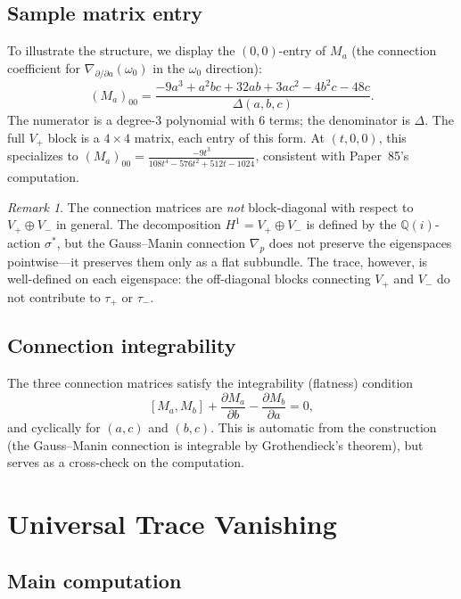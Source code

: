 \documentclass[11pt,a4paper]{article}
\theoremstyle{definition}
\theoremstyle{remark}
\newtheorem{remark}[theorem]{Remark}
\newcommand{\QQ}{\mathbb{Q}}
\begin{document}
\subsection{Sample matrix entry}

To illustrate the structure, we display the $(0,0)$-entry of $M_a$
(the connection coefficient for $\nabla_{\partial/\partial a}(\omega_0)$
in the $\omega_0$ direction):
\[
  (M_a)_{00} = \frac{-9a^3 + a^2bc + 32ab + 3ac^2 - 4b^2c - 48c}{\Delta(a,b,c)}.
\]
The numerator is a degree-3 polynomial with 6 terms; the denominator is
$\Delta$.
The full $V_+$ block is a $4 \times 4$ matrix, each entry of this form.
At $(t,0,0)$, this specializes to $(M_a)_{00} = \frac{-9t^3}{108t^4 - 576t^2 + 512t - 1024}$,
consistent with Paper~85's computation.

\begin{remark}\label{rem:block}
The connection matrices are \emph{not} block-diagonal with respect to
$V_+ \oplus V_-$ in general.
The decomposition $H^1 = V_+ \oplus V_-$ is defined by the $\QQ(i)$-action
$\sigma^*$, but the Gauss--Manin connection $\nabla_p$ does not preserve
the eigenspaces pointwise---it preserves them only as a flat subbundle.
The trace, however, is well-defined on each eigenspace: the off-diagonal
blocks connecting $V_+$ and $V_-$ do not contribute to $\tau_+$ or $\tau_-$.
\end{remark}

\subsection{Connection integrability}

The three connection matrices satisfy the integrability (flatness) condition
\[
  [M_a, M_b] + \frac{\partial M_a}{\partial b} - \frac{\partial M_b}{\partial a} = 0,
\]
and cyclically for $(a,c)$ and $(b,c)$.
This is automatic from the construction (the Gauss--Manin connection is
integrable by Grothendieck's theorem), but serves as a cross-check on
the computation.


\section{Universal Trace Vanishing}

\subsection{Main computation}
\end{document}
